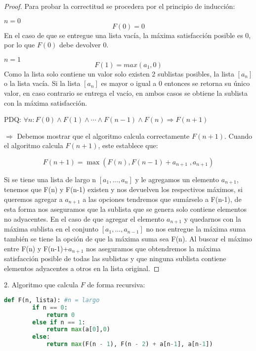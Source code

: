 \documentclass[
	spanish, %
	letterpaper, oneside
]{article}
\begin{document}
\begin{proof}
	Para probar la correctitud se procedera por el principio de inducción:


    $n=0$
    $$F(0) = 0$$
    En el caso de que se entregue una lista vacía, la máxima satisfacción posible es 0, por lo que $F(0)$ debe devolver 0.

	$n=1$
    $$F(1) = max(a_1, 0)$$
    Como la lista solo contiene un valor solo existen 2 sublistas posibles, la lista $[a_n]$ o la lista vacía. Si la lista $[a_n]$ es mayor o igual a 0 entonces se retorna su único valor, en caso contrario se entrega el vacío, en ambos casos se obtiene la sublista con la máxima satisfacción.


    PDQ: $\forall n:  F(0) \land F(1) \land \cdots \land F(n-1) \land F(n) \Rightarrow F(n+1)$
    
    $\Rightarrow$ Debemos mostrar que el algoritmo calcula correctamente $F(n+1)$. Cuando el algoritmo calcula $F(n+1)$, este establece que:

    $$F(n+1) = \max(F(n), F(n-1) + a_{n+1}\;,a_{n+1})$$

    Si se tiene una lista de largo n $[a_1,...,a_n]$ y le agregamos un elemento $a_{n+1}$, tenemos que F(n) y F(n-1) existen y nos devuelven los respectivos máximos, si queremos agregar a $a_{n+1}$ a las opciones tendremos que sumárselo a F(n-1), de esta forma nos aseguramos que la sublista que se genera solo contiene elementos no adyacentes. En el caso de que agregar el elemento $a_{n+1}$ y quedarnos con la máxima sublista en el conjunto $[a_1,...,a_{n-1}]$ no nos entregue la máxima suma también se tiene la opción de que la máxima suma sea F(n). Al buscar el máximo entre F(n) y F(n-1)+$a_{n+1}$ nos aseguramos que obtendremos la máxima satisfacción posible de todas las sublistas y que ninguna sublista contiene elementos adyacentes a otros en la lista original.
    

\end{proof}
\newpage

2. Algoritmo que calcula $F$ de forma recursiva:

\begin{lstlisting}[language=Python]
    def F(n, lista): #n = largo
        if n == 0:
            return 0
        else if n == 1:
            return max(a[0],0)
        else:
            return max(F(n - 1), F(n - 2) + a[n-1], a[n-1])
\end{lstlisting}
\end{document}
